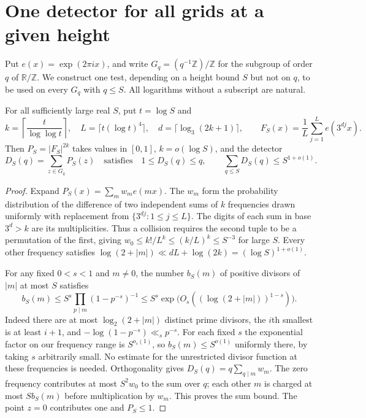 \section{One detector for all grids at a given height}\label{sec:detector}

Put $e(x)=\exp(2\pi i x)$, and write $G_q=(q^{-1}\mathbb Z)/\mathbb Z$
for the subgroup of order $q$ of $\mathbb R/\mathbb Z$. We construct one
test, depending on a height bound $S$ but not on $q$, to be used on every
$G_q$ with $q\le S$. All logarithms without a subscript are natural.

\begin{proposition}\label{prop:detector}
For all sufficiently large real $S$, put $t=\log S$ and
\[
 k=\left\lceil\frac{t}{\log\log t}\right\rceil,\quad
 L=\lceil t(\log t)^4\rceil,\quad
 d=\lceil\log_3(2k+1)\rceil,\qquad
 F_S(x)=\frac1L\sum_{j=1}^L e(3^{dj}x).
\]
Then $P_S=|F_S|^{2k}$ takes values in $[0,1]$, $k=o(\log S)$, and
the detector
\[
 D_S(q)=\sum_{z\in G_q}P_S(z)
 \quad\text{satisfies}\quad
 1\le D_S(q)\le q,\qquad \sum_{q\le S}D_S(q)\le S^{1+o(1)} .
\]
\end{proposition}
\begin{proof}
Expand $P_S(x)=\sum_m w_m e(mx)$. The $w_m$ form the probability
distribution of the difference of two independent sums of $k$ frequencies
drawn uniformly with replacement from $\{3^{dj}:1\le j\le L\}$.
The digits of each sum in base $3^d>k$ are its multiplicities. Thus a
collision requires the second tuple to be a permutation of the first, giving
$w_0\le k!/L^k\le (k/L)^k\le S^{-3}$ for large $S$.
Every other frequency satisfies
$\log(2+|m|)\ll dL+\log(2k)=(\log S)^{1+o(1)}$.

For any fixed $0<s<1$ and $m\ne0$, the number $b_S(m)$ of positive
divisors of $|m|$ at most $S$ satisfies
\[
 b_S(m)\le S^s \prod_{p\mid m}(1-p^{-s})^{-1}
 \le S^s\exp\bigl(O_s((\log(2+|m|))^{1-s})\bigr).
\]
Indeed there are at most $\log_2(2+|m|)$ distinct prime divisors,
the $i$th smallest is at least $i+1$, and
$-\log(1-p^{-s})\ll_s p^{-s}$. For each fixed $s$ the exponential factor
on our frequency range is $S^{o_s(1)}$, so $b_S(m)\le S^{o(1)}$
uniformly there, by taking $s$ arbitrarily small. No estimate for the
unrestricted divisor function at these frequencies is needed.
Orthogonality gives $D_S(q)=q\sum_{q\mid m}w_m$. The zero frequency
contributes at most $S^2w_0$ to the sum over $q$; each other $m$ is
charged at most $S b_S(m)$ before multiplication by $w_m$. This proves
the sum bound. The point $z=0$ contributes one and $P_S\le1$.
\end{proof}


